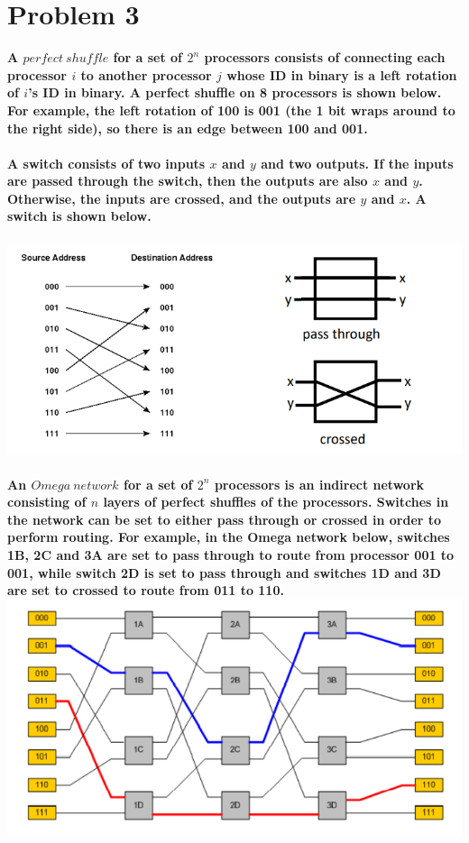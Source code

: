\documentclass{article}
\begin{document}
\section{Problem 3}
\textcolor[rgb]{0,0,1}{\textbf{A $perfect\ shuffle$ for a set of $2^n$ processors consists of connecting each processor $i$ to another processor $j$ whose ID in binary is a left rotation of $i$'s ID in binary. A perfect shuffle on 8 processors is shown below. For example, the left rotation of 100 is 001 (the 1 bit wraps around to the right side), so there is an edge between 100 and 001.\\\\
A switch consists of two inputs $x$ and $y$ and two outputs. If the inputs are passed 
through the switch, then the outputs are also $x$ and $y$. Otherwise, the inputs are 
crossed, and the outputs are $y$ and $x$. A switch is shown below.\\\\
}}
\includegraphics[scale=0.5]{fig1.png}\\\\
\textcolor[rgb]{0,0,1}{\textbf{An $Omega\ network$ for a set of $2^n$ processors is an indirect network consisting of $n$ layers of perfect shuffles of the processors. Switches in the network can be set to either pass through or crossed in order to perform routing. For example, in the Omega network below, switches 1B, 2C and 3A are set to pass through to route from processor 001 to 001, while switch 2D is set to pass through and switches 1D and 3D are set to crossed to route from 011 to 110. }}
\includegraphics[scale=0.6]{fig2.png}\\
\end{document}
